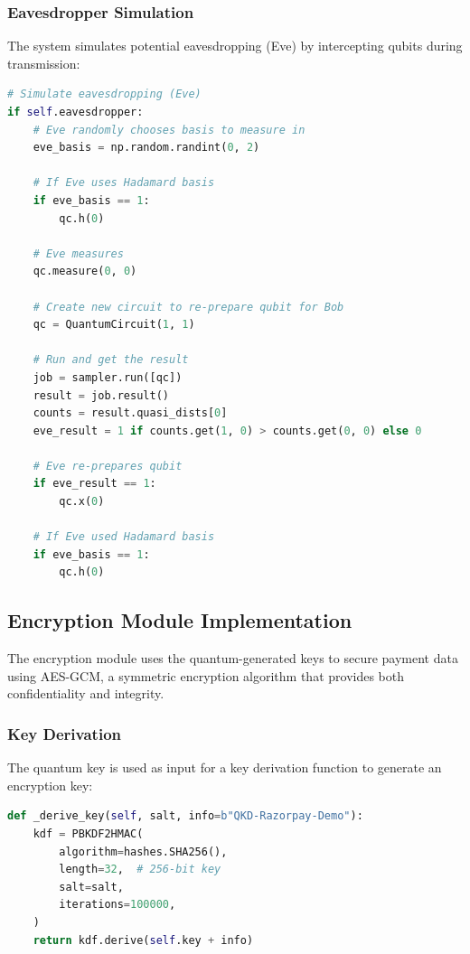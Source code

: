 \documentclass[conference]{IEEEtran}
\begin{document}
\subsubsection{Eavesdropper Simulation}
The system simulates potential eavesdropping (Eve) by intercepting qubits during transmission:

\begin{lstlisting}[language=Python, caption=Eavesdropper Simulation]
# Simulate eavesdropping (Eve)
if self.eavesdropper:
    # Eve randomly chooses basis to measure in
    eve_basis = np.random.randint(0, 2)
    
    # If Eve uses Hadamard basis
    if eve_basis == 1:
        qc.h(0)
    
    # Eve measures
    qc.measure(0, 0)
    
    # Create new circuit to re-prepare qubit for Bob
    qc = QuantumCircuit(1, 1)
    
    # Run and get the result
    job = sampler.run([qc])
    result = job.result()
    counts = result.quasi_dists[0]
    eve_result = 1 if counts.get(1, 0) > counts.get(0, 0) else 0
    
    # Eve re-prepares qubit
    if eve_result == 1:
        qc.x(0)
    
    # If Eve used Hadamard basis
    if eve_basis == 1:
        qc.h(0)
\end{lstlisting}

\subsection{Encryption Module Implementation}
The encryption module uses the quantum-generated keys to secure payment data using AES-GCM, a symmetric encryption algorithm that provides both confidentiality and integrity.

\subsubsection{Key Derivation}
The quantum key is used as input for a key derivation function to generate an encryption key:

\begin{lstlisting}[language=Python, caption=Key Derivation from Quantum Key]
def _derive_key(self, salt, info=b"QKD-Razorpay-Demo"):
    kdf = PBKDF2HMAC(
        algorithm=hashes.SHA256(),
        length=32,  # 256-bit key
        salt=salt,
        iterations=100000,
    )
    return kdf.derive(self.key + info)
\end{lstlisting}
\end{document}
